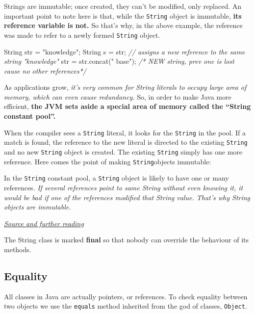 \documentclass[]{article}
\newenvironment{Shaded}{}{}
\newcommand{\BuiltInTok}[1]{#1}
\newcommand{\CommentTok}[1]{\textcolor[rgb]{0.38,0.63,0.69}{\textit{#1}}}
\newcommand{\FunctionTok}[1]{\textcolor[rgb]{0.02,0.16,0.49}{#1}}
\newcommand{\NormalTok}[1]{#1}
\newcommand{\StringTok}[1]{\textcolor[rgb]{0.25,0.44,0.63}{#1}}
\begin{document}
Strings are immutable; once created, they can't be modified, only
replaced. An important point to note here is that, while the
\texttt{String} object is immutable, \textbf{its reference variable is
not.} So that's why, in the above example, the reference was made to
refer to a newly formed \texttt{String} object.

\begin{Shaded}
\begin{Highlighting}[]
\BuiltInTok{String}\NormalTok{ str = }\StringTok{"knowledge"}\NormalTok{;}
\BuiltInTok{String}\NormalTok{ s = str; }\CommentTok{// assigns a new reference to the same string "knowledge"}
\NormalTok{str = str.}\FunctionTok{concat}\NormalTok{(}\StringTok{" base"}\NormalTok{); }\CommentTok{/* NEW string, prev one is lost cause no other references*/}
\end{Highlighting}
\end{Shaded}

As applications grow, \emph{it's very common for String literals to
occupy large area of memory, which can even cause redundancy.} So, in
order to make Java more efficient, \textbf{the JVM sets aside a special
area of memory called the ``String constant pool''.}

When the compiler sees a \texttt{String} literal, it looks for the
\texttt{String} in the pool. If a match is found, the reference to the
new literal is directed to the existing \texttt{String} and no new
\texttt{String} object is created. The existing \texttt{String} simply
has one more reference. Here comes the point of making
\texttt{String}objects immutable:

In the \texttt{String} constant pool, a \texttt{String} object is likely
to have one or many references. \emph{If several references point to
same String without even knowing it, it would be bad if one of the
references modified that String value. That's why String objects are
immutable.}

\emph{\href{https://stackoverflow.com/questions/8798403/string-is-immutable-what-exactly-is-the-meaning}{Source
and further reading}}

The String class is marked \textbf{final} so that nobody can override
the behaviour of its methods.

\hypertarget{equality}{%
\subsection{Equality}\label{equality}}

All classes in Java are actually pointers, or references. To check
equality between two objects we use the \texttt{equals} method inherited
from the god of classes, \texttt{Object}.
\end{document}

